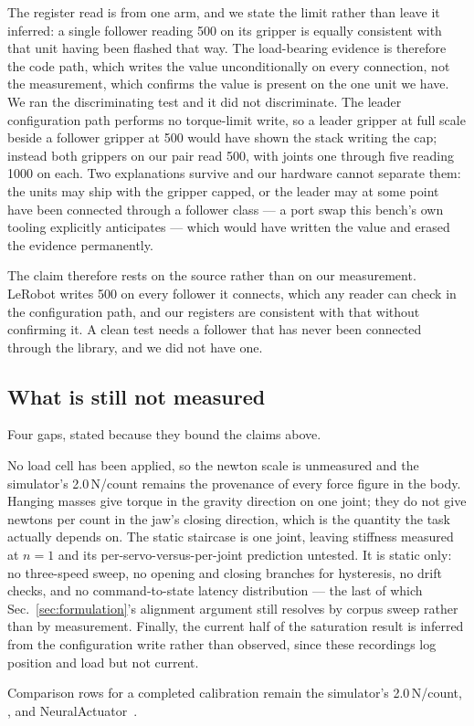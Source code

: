 \documentclass{article}
\begin{document}
The register read is from one arm, and we state the limit rather than leave
it inferred: a single follower reading 500 on its gripper is equally
consistent with that unit having been flashed that way. The load-bearing
evidence is therefore the code path, which writes the value unconditionally
on every connection, not the measurement, which confirms the value is present
on the one unit we have. We ran the discriminating test and it did not
discriminate. The leader configuration path performs no torque-limit write, so
a leader gripper at full scale beside a follower gripper at 500 would have
shown the stack writing the cap; instead both grippers on our pair read 500,
with joints one through five reading 1000 on each. Two explanations survive
and our hardware cannot separate them: the units may ship with the gripper
capped, or the leader may at some point have been connected through a follower
class --- a port swap this bench's own tooling explicitly anticipates --- which
would have written the value and erased the evidence permanently.

The claim therefore rests on the source rather than on our measurement.
LeRobot writes 500 on every follower it connects, which any reader can check
in the configuration path, and our registers are consistent with that without
confirming it. A clean test needs a follower that has never been connected
through the library, and we did not have one.

\subsection{What is still not measured}

Four gaps, stated because they bound the claims above.

No load cell has been applied, so the newton scale is unmeasured and the
simulator's 2.0\,N/count remains the provenance of every force figure in
the body. Hanging masses give torque in the gravity direction on one joint;
they do not give newtons per count in the jaw's closing direction, which is
the quantity the task actually depends on. The static staircase is one
joint, leaving stiffness measured at $n=1$ and its per-servo-versus-per-joint
prediction untested. It is static only: no three-speed sweep, no opening
and closing branches for hysteresis, no drift checks, and no
command-to-state latency distribution --- the last of which
Sec.~\ref{sec:formulation}'s alignment argument still resolves by corpus
sweep rather than by measurement. Finally, the current half of the
saturation result is inferred from the configuration write rather than
observed, since these recordings log position and load but not current.

Comparison rows for a completed calibration remain the simulator's
2.0\,N/count, \citet{hwang2018virtual}, and
NeuralActuator~\citep{dou2026neuralactuator}.
\end{document}
